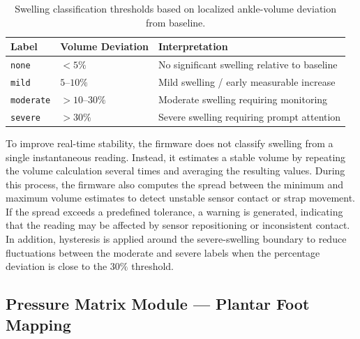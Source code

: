 \begin{table}[htbp]
  \centering
  \caption{Swelling classification thresholds based on localized ankle-volume deviation from baseline.}
  \label{tab:edema}
  \begin{tabularx}{\textwidth}{l l X}
    \hline
    \textbf{Label} & \textbf{Volume Deviation} & \textbf{Interpretation} \\
    \hline
    \texttt{none}     & $<5\%$        & No significant swelling relative to baseline \\
    \texttt{mild}     & $5$--$10\%$   & Mild swelling / early measurable increase \\
    \texttt{moderate} & $>10$--$30\%$ & Moderate swelling requiring monitoring \\
    \texttt{severe}   & $>30\%$       & Severe swelling requiring prompt attention \\
    \hline
  \end{tabularx}
\end{table}

\noindent To improve real-time stability, the firmware does not classify swelling from a single instantaneous reading. Instead, it estimates a stable volume by repeating the volume calculation several times and averaging the resulting values. During this process, the firmware also computes the spread between the minimum and maximum volume estimates to detect unstable sensor contact or strap movement. If the spread exceeds a predefined tolerance, a warning is generated, indicating that the reading may be affected by sensor repositioning or inconsistent contact. In addition, hysteresis is applied around the severe-swelling boundary to reduce fluctuations between the moderate and severe labels when the percentage deviation is close to the $30\%$ threshold. \\


\subsection{Pressure Matrix Module — Plantar Foot Mapping}
\label{subsec:fw_pressure}

